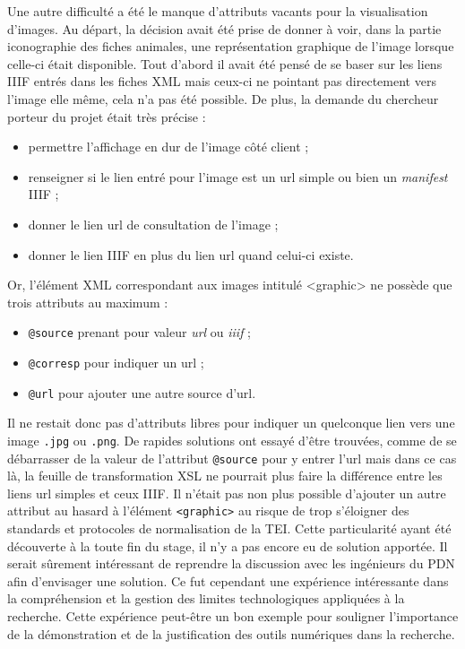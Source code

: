 \documentclass[a4paper,12pt,twoside]{book}
\begin{document}
Une autre difficulté a été le manque d'attributs vacants pour la visualisation d'images. Au départ, la décision avait été prise de donner à voir, dans la partie iconographie des fiches animales, une représentation graphique de l'image lorsque celle-ci était disponible. Tout d'abord il avait été pensé de se baser sur les liens IIIF entrés dans les fiches XML mais ceux-ci ne pointant pas directement vers l'image elle même, cela n'a pas été possible. De plus, la demande du chercheur porteur du projet était très précise :
\begin{itemize}
    \item permettre l'affichage en dur de l'image côté client ;
    \item renseigner si le lien entré pour l'image est un url simple ou bien un \textit{manifest} \acrshort{IIIF} ;
    \item donner le lien url de consultation de l'image ;
    \item donner le lien \acrshort{IIIF} en plus du lien url quand celui-ci existe.
\end{itemize}
Or, l'élément XML correspondant aux images intitulé <graphic> ne possède que trois attributs au maximum :
\begin{itemize}
    \item \texttt{@source} prenant pour valeur \textit{url} ou \textit{iiif} ;
    \item \texttt{@corresp} pour indiquer un url ;
    \item \texttt{@url} pour ajouter une autre source d'url.
\end{itemize}
Il ne restait donc pas d'attributs libres pour indiquer un quelconque lien vers une image \texttt{.jpg} ou \texttt{.png}. De rapides solutions ont essayé d'être trouvées, comme de se débarrasser de la valeur de l'attribut \texttt{@source} pour y entrer l'url mais dans ce cas là, la feuille de transformation \acrshort{XSL} ne pourrait plus faire la différence entre les liens url simples et ceux \acrshort{IIIF}. Il n'était pas non plus possible d'ajouter un autre attribut au hasard à l'élément \texttt{<graphic>} au risque de trop s'éloigner des standards et protocoles de normalisation de la TEI. Cette particularité ayant été découverte à la toute fin du stage, il n'y a pas encore eu de solution apportée. Il serait sûrement intéressant de reprendre la discussion avec les ingénieurs du \acrshort{PDN} afin d'envisager une solution. Ce fut cependant une expérience intéressante dans la compréhension et la gestion des limites technologiques appliquées à la recherche. Cette expérience peut-être un bon exemple pour souligner l'importance de la démonstration et de la justification des outils numériques dans la recherche.
\end{document}
